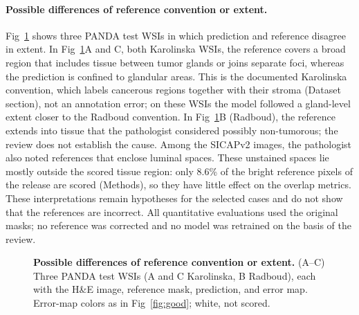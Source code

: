 \documentclass[10pt,letterpaper]{article}
\begin{document}
\paragraph{Possible differences of reference convention or extent.}
Fig~\ref{fig:annotation_discrepancies} shows three PANDA test WSIs in which prediction and reference disagree in extent. In Fig~\ref{fig:annotation_discrepancies}A and C, both Karolinska WSIs, the reference covers a broad region that includes tissue between tumor glands or joins separate foci, whereas the prediction is confined to glandular areas. This is the documented Karolinska convention, which labels cancerous regions together with their stroma (Dataset section), not an annotation error; on these WSIs the model followed a gland-level extent closer to the Radboud convention. In Fig~\ref{fig:annotation_discrepancies}B (Radboud), the reference extends into tissue that the pathologist considered possibly non-tumorous; the review does not establish the cause. Among the SICAPv2 images, the pathologist also noted references that enclose luminal spaces. These unstained spaces lie mostly outside the scored tissue region: only 8.6\% of the bright reference pixels of the release are scored (Methods), so they have little effect on the overlap metrics. These interpretations remain hypotheses for the selected cases and do not show that the references are incorrect. All quantitative evaluations used the original masks; no reference was corrected and no model was retrained on the basis of the review.

\begin{figure}[H]
\centering
\caption{\textbf{Possible differences of reference convention or extent.} (A--C) Three PANDA test WSIs (A and C Karolinska, B Radboud), each with the H\&E image, reference mask, prediction, and error map. Error-map colors as in Fig~\ref{fig:good}; white, not scored.}
\label{fig:annotation_discrepancies}
\end{figure}
\end{document}
